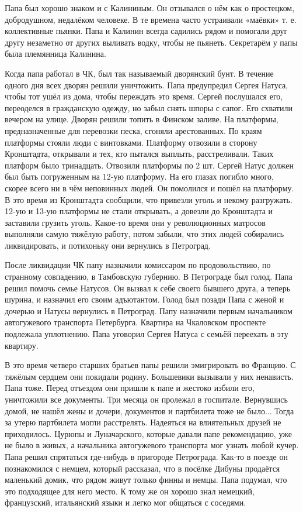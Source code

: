 Папа был хорошо знаком и с Калининым.
Он отзывался о нём как о простецком, добродушном, недалёком человеке.
В те времена часто устраивали «маёвки» т. е. коллективные  пьянки.
Папа и Калинин всегда садились рядом и помогали друг другу незаметно от других выливать водку, чтобы не пьянеть.
Секретарём у папы была племянница Калинина.

Когда папа работал в ЧК, был так называемый дворянский бунт.
В течение одного дня всех дворян решили уничтожить.
Папа предупредил Сергея Натуса, чтобы тот  ушёл из дома, чтобы переждать это время.
Сергей послушался его, переоделся в гражданскую одежду, но забыл снять шпоры с сапог.
Его схватили вечером на улице.
Дворян решили топить в Финском заливе.
На платформы, предназначенные для перевозки песка, сгоняли арестованных.
По краям платформы стояли люди с винтовками.
Платформу отвозили в сторону Кронштадта, открывали и тех, кто пытался выплыть, расстреливали.
Таких платформ было тринадцать.
Отвозили платформы по 2 шт.
Сергей Натус должен был  быть погруженным на 12-ую платформу.
На его глазах погибло много, скорее всего ни в чём неповинных людей.
Он помолился и пошёл на платформу.
В это время из Кронштадта сообщили, что привезли уголь и некому разгружать.
12-ую и 13-ую платформы не стали открывать, а довезли до Кронштадта и заставили грузить уголь.
Какое-то время они у революционных матросов выполняли самую тяжёлую работу, потом забыли, что этих людей собирались ликвидировать, и потихоньку они вернулись в Петроград.

После ликвидации ЧК папу назначили комиссаром по продовольствию, по странному совпадению, в Тамбовскую губернию.
В Петрограде был голод.
Папа решил помочь семье Натусов.
Он вызвал к себе своего бывшего друга, а теперь шурина, и назначил его своим адъютантом.
Голод был позади  Папа с женой и дочерью и Натусы вернулись в Петроград.
Папу назначили первым начальником автогужевого транспорта Петербурга.
Квартира на Чкаловском проспекте подлежала уплотнению.
Папа уговорил Сергея Натуса с семьёй переехать в эту квартиру.

В это время четверо старших братьев папы решили эмигрировать во Францию.
С тяжёлым сердцем они покидали родину.
Большевики вызывали у них ненависть.
Папа тоже.
Перед отъездом они пришли к папе и жестоко избили его, уничтожили все документы.
Три месяца он пролежал в госпитале.
Вернувшись домой, не нашёл жены и дочери, документов и партбилета тоже не было...
Тогда за утерю партбилета могли расстрелять.
Надеяться на влиятельных друзей не приходилось.
Цурюпы и Луначарского, которые давали папе рекомендацию, уже не было в живых, а начальника автогужевого транспорта мог узнать любой кучер.
Папа решил спрятаться где-нибудь в пригороде Петрограда.
Как-то в поезде он познакомился с немцем, который рассказал, что в посёлке Дибуны продаётся маленький домик, что рядом живут только финны и немцы.
Папа подумал, что это подходящее для него место.
К тому же он хорошо знал немецкий, французский, итальянский языки и легко мог общаться с соседями.

